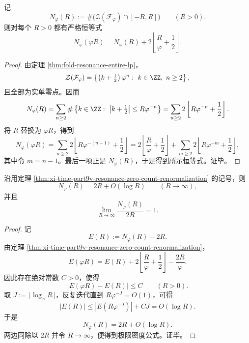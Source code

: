 \begin{theorem}[共振零点计数的精确重整化方程]\label{thm:xi-time-part9v-resonance-zero-count-renormalization}
记
\[
N_\varphi(R):=\#\bigl(\mathcal Z(\mathcal F_\varphi)\cap[-R,R]\bigr)
\qquad (R>0).
\]
则对每个 \(R>0\) 都有严格恒等式
\[
N_\varphi(\varphi R)
=
N_\varphi(R)
+
2\left\lfloor \frac{R}{\varphi}+\frac12\right\rfloor.
\]
\end{theorem}
\begin{proof}
由定理 \ref{thm:fold-resonance-entire-lp}，
\[
\mathcal Z(\mathcal F_\varphi)=
\left\{
\left(k+\tfrac12\right)\varphi^n:\ k\in\ZZ,\ n\ge 2
\right\},
\]
且全部为实单零点。因而
\[
N_\varphi(R)
=
\sum_{n\ge 2}
\#\left\{
k\in\ZZ:\ \left|k+\tfrac12\right|\le R\varphi^{-n}
\right\}
=
\sum_{n\ge 2}2\left\lfloor R\varphi^{-n}+\frac12\right\rfloor.
\]
将 \(R\) 替换为 \(\varphi R\)，得到
\[
N_\varphi(\varphi R)
=
\sum_{n\ge 2}2\left\lfloor R\varphi^{-(n-1)}+\frac12\right\rfloor
=
2\left\lfloor \frac{R}{\varphi}+\frac12\right\rfloor
+
\sum_{m\ge 2}2\left\lfloor R\varphi^{-m}+\frac12\right\rfloor,
\]
其中令 \(m=n-1\)。最后一项正是 \(N_\varphi(R)\)，于是得到所示恒等式。证毕。
\end{proof}

\begin{corollary}[共振零点的线性密度律]\label{cor:xi-time-part9v-resonance-zero-density-linear}
沿用定理 \ref{thm:xi-time-part9v-resonance-zero-count-renormalization} 的记号，则
\[
N_\varphi(R)=2R+O(\log R)
\qquad (R\to\infty),
\]
并且
\[
\lim_{R\to\infty}\frac{N_\varphi(R)}{2R}=1.
\]
\end{corollary}
\begin{proof}
记
\[
E(R):=N_\varphi(R)-2R.
\]
由定理 \ref{thm:xi-time-part9v-resonance-zero-count-renormalization}，
\[
E(\varphi R)
=
E(R)+
2\left\lfloor \frac{R}{\varphi}+\frac12\right\rfloor
-
\frac{2R}{\varphi}.
\]
因此存在绝对常数 \(C>0\)，使得
\[
|E(\varphi R)-E(R)|\le C
\qquad (R>0).
\]
取 \(J:=\lfloor \log_\varphi R\rfloor\)，反复迭代直到 \(R\varphi^{-J}=O(1)\)，可得
\[
|E(R)|\le |E(R\varphi^{-J})|+CJ=O(\log R).
\]
于是
\[
N_\varphi(R)=2R+O(\log R).
\]
两边同除以 \(2R\) 并令 \(R\to\infty\)，便得到极限密度公式。证毕。
\end{proof}

